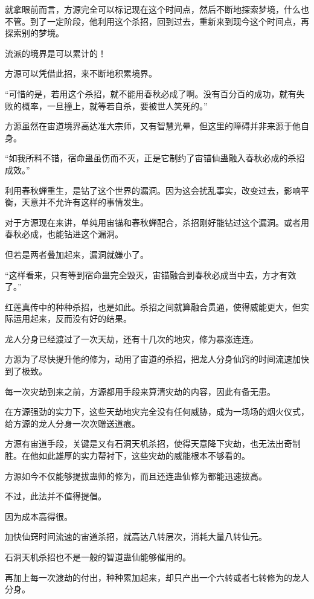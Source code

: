 \begin{this_body}
就拿眼前而言，方源完全可以标记现在这个时间点，然后不断地探索梦境，什么也不管。到了一定阶段，他利用这个杀招，回到过去，重新来到现今这个时间点，再探索别的梦境。

流派的境界是可以累计的！

方源可以凭借此招，来不断地积累境界。

“可惜的是，若用这个杀招，就不能用春秋必成了啊。没有百分百的成功，就有失败的概率，一旦撞上，就等若自杀，要被世人笑死的。”

方源虽然在宙道境界高达准大宗师，又有智慧光晕，但这里的障碍并非来源于他自身。

“如我所料不错，宿命蛊虽伤而不灭，正是它制约了宙锚仙蛊融入春秋必成的杀招成效。”

利用春秋蝉重生，是钻了这个世界的漏洞。因为这会扰乱事实，改变过去，影响平衡，天意并不允许有这样的事情发生。

对于方源现在来讲，单纯用宙锚和春秋蝉配合，杀招刚好能钻过这个漏洞。或者用春秋必成，也能钻进这个漏洞。

但若是两者叠加起来，漏洞就嫌小了。

“这样看来，只有等到宿命蛊完全毁灭，宙锚融合到春秋必成当中去，方才有效了。”

红莲真传中的种种杀招，也是如此。杀招之间就算融合贯通，使得威能更大，但实际运用起来，反而没有好的结果。

龙人分身已经渡过了一次天劫，还有十几次的地灾，修为暴涨连连。

方源为了尽快提升他的修为，动用了宙道的杀招，把龙人分身仙窍的时间流速加快到了极致。

每一次灾劫到来之前，方源都用手段来算清灾劫的内容，因此有备无患。

在方源强劲的实力下，这些天劫地灾完全没有任何威胁，成为一场场的烟火仪式，给方源的龙人分身一次次赠送道痕。

方源有宙道手段，关键是又有石洞天机杀招，使得天意降下灾劫，也无法出奇制胜。在他如此雄厚的实力帮衬下，这些灾劫的威能根本不够看的。

方源如今不仅能够提拔蛊师的修为，而且还连蛊仙修为都能迅速拔高。

不过，此法并不值得提倡。

因为成本高得很。

加快仙窍时间流速的宙道杀招，就高达八转层次，消耗大量八转仙元。

石洞天机杀招也不是一般的智道蛊仙能够催用的。

再加上每一次渡劫的付出，种种累加起来，却只产出一个六转或者七转修为的龙人分身。


\end{this_body}
